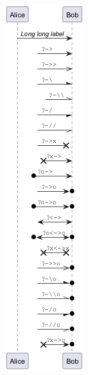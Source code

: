 \begin{center}
\includegraphics[scale=0.60]{imgw/img-a69f4fcce82e8fa500e2a898194cffca.png}
\end{center}


